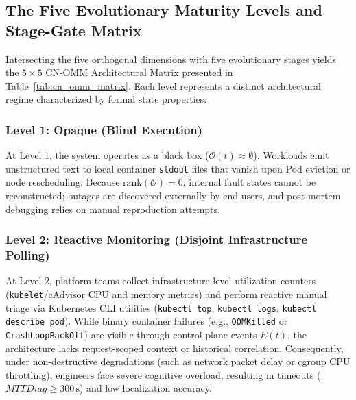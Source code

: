 

\subsection{The Five Evolutionary Maturity Levels and Stage-Gate Matrix}
\label{subsec:maturity_levels}

Intersecting the five orthogonal dimensions with five evolutionary stages yields the $5 \times 5$ CN-OMM Architectural Matrix presented in Table~\ref{tab:cn_omm_matrix}. Each level represents a distinct architectural regime characterized by formal state properties:



\subsubsection{Level 1: Opaque (Blind Execution)}
At Level 1, the system operates as a black box ($\mathcal{O}(t) \approx \emptyset$). Workloads emit unstructured text to local container \texttt{stdout} files that vanish upon Pod eviction or node rescheduling. Because $\text{rank}(\mathcal{O}) = 0$, internal fault states cannot be reconstructed; outages are discovered externally by end users, and post-mortem debugging relies on manual reproduction attempts.

\subsubsection{Level 2: Reactive Monitoring (Disjoint Infrastructure Polling)}
At Level 2, platform teams collect infrastructure-level utilization counters (\texttt{kubelet}/cAdvisor CPU and memory metrics) and perform reactive manual triage via Kubernetes CLI utilities (\texttt{kubectl top}, \texttt{kubectl logs}, \texttt{kubectl describe pod}). While binary container failures (e.g., \texttt{OOMKilled} or \texttt{CrashLoopBackOff}) are visible through control-plane events $E(t)$, the architecture lacks request-scoped context or historical correlation. Consequently, under non-destructive degradations (such as network packet delay or cgroup CPU throttling), engineers face severe cognitive overload, resulting in timeouts ($MTTDiag \ge 300\,\text{s}$) and low localization accuracy.

